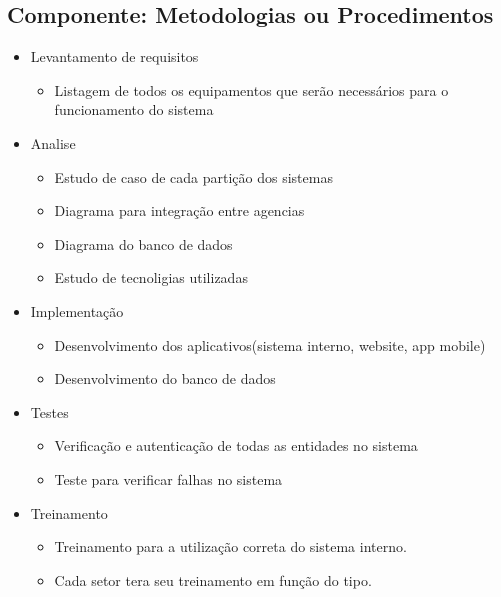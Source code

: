 \subsection{Componente: Metodologias ou Procedimentos}
\begin{itemize}
       \item Levantamento de requisitos
              \begin{itemize}
                     \item Listagem de todos os equipamentos que serão necessários para o funcionamento do
                     sistema
                     
              \end{itemize}
       \item Analise
              \begin{itemize}
                     \item Estudo de caso de cada partição dos sistemas
                     \item Diagrama para integração entre agencias
                     \item Diagrama do banco de dados
                     \item Estudo de tecnoligias utilizadas
              \end{itemize}
       \item Implementação
              \begin{itemize}
                     \item Desenvolvimento dos aplicativos(sistema interno, website, app mobile)
                     \item Desenvolvimento do banco de dados
              \end{itemize}
       \item Testes
              \begin{itemize}
                     \item Verificação e autenticação de todas as entidades no sistema
                     \item Teste para verificar falhas no sistema 
              \end{itemize}
       \item Treinamento 
       \begin{itemize}
              \item Treinamento para a utilização correta do sistema interno.
              \item Cada setor tera seu treinamento em função do tipo.
       \end{itemize}
\end{itemize}

